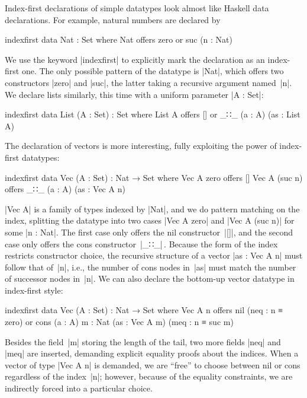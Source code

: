 Index-first declarations of simple datatypes look almost like Haskell data declarations.
For example, natural numbers are declared by
\begin{code}
indexfirst data Nat : Set where
  Nat  offers  zero
       or      suc (n : Nat)
\end{code}
We use the keyword |indexfirst| to explicitly mark the declaration as an index-first one.
The only possible pattern of the datatype is |Nat|, which offers two constructors |zero| and |suc|, the latter taking a recursive argument named~|n|.
We declare lists similarly, this time with a uniform parameter |A : Set|:
\begin{code}
indexfirst data List (A : Set) : Set where
  List A  offers  []
          or      _∷_ (a : A) (as : List A)
\end{code}
The declaration of vectors is more interesting, fully exploiting the power of index-first datatypes:
\begin{code}
indexfirst data Vec (A : Set) : Nat → Set where
  Vec A zero     offers  []
  Vec A (suc n)  offers  _∷_ (a : A) (as : Vec A n)
\end{code}
|Vec A| is a family of types indexed by |Nat|, and we do pattern matching on the index, splitting the datatype into two cases |Vec A zero| and |Vec A (suc n)| for some |n : Nat|.
The first case only offers the nil constructor~|[]|, and the second case only offers the cons constructor~|_∷_|\,.
Because the form of the index restricts constructor choice, the recursive structure of a vector |as : Vec A n| must follow that of~|n|, i.e., the number of cons nodes in~|as| must match the number of successor nodes in~|n|.
We can also declare the bottom-up vector datatype in index-first style:
\begin{code}
indexfirst data Vec (A : Set) : Nat → Set where
  Vec A n  offers  nil (neq : n ≡ zero)
           or      cons  (a : A) {m : Nat}
                         (as : Vec A m) (meq : n ≡ suc m)
\end{code}
Besides the field~|m| storing the length of the tail, two more fields |neq| and |meq| are inserted, demanding explicit equality proofs about the indices.
When a vector of type |Vec A n| is demanded, we are ``free'' to choose between nil or cons regardless of the index~|n|; however, because of the equality constraints, we are indirectly forced into a particular choice.


